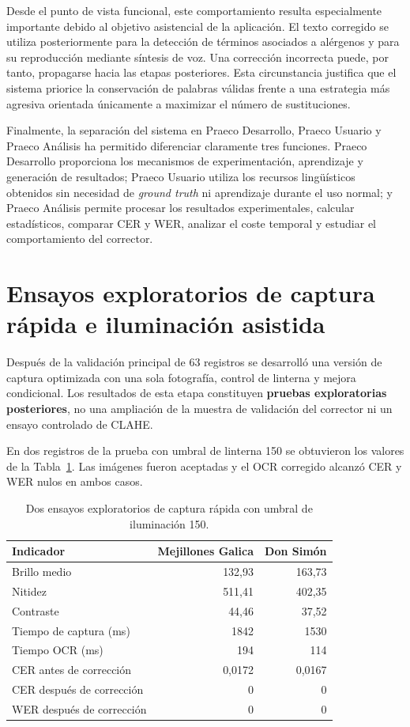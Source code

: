 Desde el punto de vista funcional, este comportamiento resulta especialmente importante debido al objetivo asistencial de la aplicación. El texto corregido se utiliza posteriormente para la detección de términos asociados a alérgenos y para su reproducción mediante síntesis de voz. Una corrección incorrecta puede, por tanto, propagarse hacia las etapas posteriores. Esta circunstancia justifica que el sistema priorice la conservación de palabras válidas frente a una estrategia más agresiva orientada únicamente a maximizar el número de sustituciones.

Finalmente, la separación del sistema en Praeco Desarrollo, Praeco Usuario y Praeco Análisis ha permitido diferenciar claramente tres funciones. Praeco Desarrollo proporciona los mecanismos de experimentación, aprendizaje y generación de resultados; Praeco Usuario utiliza los recursos lingüísticos obtenidos sin necesidad de \textit{ground truth} ni aprendizaje durante el uso normal; y Praeco Análisis permite procesar los resultados experimentales, calcular estadísticos, comparar CER y WER, analizar el coste temporal y estudiar el comportamiento del corrector.

\section{Ensayos exploratorios de captura rápida e iluminación asistida}

Después de la validación principal de 63 registros se desarrolló una versión de captura optimizada con una sola fotografía, control de linterna y mejora condicional. Los resultados de esta etapa constituyen \textbf{pruebas exploratorias posteriores}, no una ampliación de la muestra de validación del corrector ni un ensayo controlado de CLAHE.

En dos registros de la prueba con umbral de linterna 150 se obtuvieron los valores de la Tabla~\ref{tab:captura-rapida}. Las imágenes fueron aceptadas y el OCR corregido alcanzó CER y WER nulos en ambos casos.

\begin{table}[htbp]
\centering\small
\caption{Dos ensayos exploratorios de captura rápida con umbral de iluminación 150.}
\label{tab:captura-rapida}
\begin{tabular}{lrr}
\hline
\textbf{Indicador} & \textbf{Mejillones Galica} & \textbf{Don Simón}\\ \hline
Brillo medio & 132,93 & 163,73\\
Nitidez & 511,41 & 402,35\\
Contraste & 44,46 & 37,52\\
Tiempo de captura (ms) & 1842 & 1530\\
Tiempo OCR (ms) & 194 & 114\\
CER antes de corrección & 0,0172 & 0,0167\\
CER después de corrección & 0 & 0\\
WER después de corrección & 0 & 0\\ \hline
\end{tabular}
\end{table}

